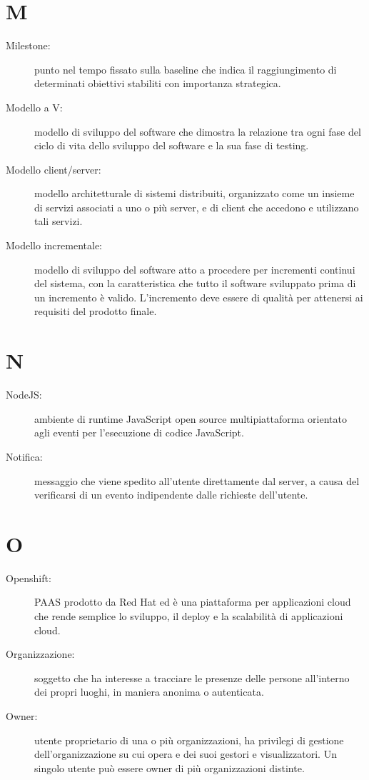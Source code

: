 \documentclass{article}
\begin{document}
  \section{M}
  \begin{description}
    \item[Milestone:] punto nel tempo fissato sulla baseline che indica il raggiungimento di determinati obiettivi stabiliti con importanza strategica.
    \item[Modello a V:] modello di sviluppo del software che dimostra la relazione tra ogni fase del ciclo di vita dello sviluppo del software e la sua fase di testing.
    \item[Modello client/server:] modello architetturale di sistemi distribuiti, organizzato come un insieme di servizi associati a uno o più server, e di client che accedono e utilizzano tali servizi.
    \item[Modello incrementale:] modello di sviluppo del software atto a procedere per incrementi continui del sistema, con la caratteristica che tutto il software sviluppato prima di un incremento è valido. L'incremento deve essere di qualità per attenersi ai requisiti del prodotto finale.

  \end{description}
  \newpage
  \section{N}
  \begin{description}
    \item[NodeJS:] ambiente di runtime JavaScript open source multipiattaforma orientato agli eventi per l'esecuzione di codice JavaScript.
    \item[Notifica:] messaggio che viene spedito all'utente direttamente dal server, a causa del verificarsi di un evento indipendente dalle richieste dell'utente.

  \end{description}
  \newpage
  \section{O}
  \begin{description}
    \item[Openshift:] PAAS prodotto da Red Hat ed è una piattaforma per applicazioni cloud che rende semplice lo sviluppo, il deploy e la scalabilità di applicazioni cloud.
    \item[Organizzazione:] soggetto che ha interesse a tracciare le presenze delle persone all'interno dei propri luoghi, in maniera anonima o autenticata.
    \item[Owner:] utente proprietario di una o più organizzazioni, ha privilegi di gestione dell'organizzazione su cui opera e dei suoi gestori e visualizzatori. Un singolo utente può essere owner di più organizzazioni distinte.

  \end{description}
  \newpage
\end{document}
